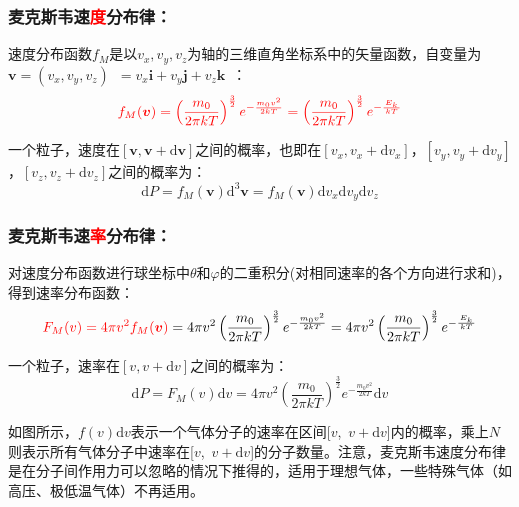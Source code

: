 \documentclass[zihao=5,UTF8]{report}
\begin{document}
\subsubsection{麦克斯韦速\textcolor{red}{度}分布律：}
速度分布函数$f_M$是以$v_x,v_y,v_z$为轴的三维直角坐标系中的矢量函数，自变量为$\boldsymbol{v} = (v_x,v_y,v_z)$\ $ = v_x\boldsymbol{i} +v_y\boldsymbol{j}+v_z\boldsymbol{k}$\ ：
\begin{equation}\textcolor{red}{f_M(\boldsymbol{v}) = \left(\frac{m_0}{2\pi kT}\right)^{\frac{3}{2}}e^{-\frac{m_0v^2}{2kT}} = \left(\frac{m_0}{2\pi kT}\right)^{\frac{3}{2}}e^{-\frac{E_k}{\,kT\,}}}
\end{equation}\par
一个粒子，速度在$[\boldsymbol{v} , \boldsymbol{v} + \mathrm{d}\boldsymbol{v}]$之间的概率，也即在$[v_x ,v_x +\mathrm{d}v_x]$，$[v_y ,v_y +\mathrm{d}v_y]$，$[v_z ,v_z +\mathrm{d}v_z]$之间的概率为：
\begin{equation}
    \mathrm{d} P =f_M(\boldsymbol{v})\mathrm{d}^3\boldsymbol{v}=f_M(\boldsymbol{v})\mathrm{d}v_x\mathrm{d}v_y\mathrm{d}v_z
\end{equation}

\subsubsection{麦克斯韦速\textcolor{red}{率}分布律：}
对速度分布函数进行球坐标中$\theta $和$\varphi$的二重积分(对相同速率的各个方向进行求和)，得到速率分布函数：
\begin{equation}\textcolor{red}{ F_M(v) = 4\pi v^2 f_M(\boldsymbol{v}) }
   = 4\pi v^2\left(\frac{m_0}{2\pi kT}\right)^{\frac{3}{2}}e^{-\frac{m_0v^2}{2kT}} = 4\pi v^2\left(\frac{m_0}{2\pi kT}\right)^{\frac{3}{2}}e^{-\frac{E_k}{\,kT\,}}
\end{equation}\par

一个粒子，速率在$[v, v+\mathrm{d}v]$之间的概率为：
\begin{equation}
    \mathrm{d} P = F_M(v)\mathrm{d}v = 4\pi v^2\left(\frac{m_0}{2\pi kT}\right)^{\frac{3}{2}}e^{-\frac{m_0v^2}{2kT}}\mathrm{d}v
\end{equation}
\par
{\color{gray}\small  如图所示，$f(v)\mathrm{d}v$表示一个气体分子的速率在区间[$v$,\ $v+\mathrm{d}v$]内的概率，乘上$N$则表示所有气体分子中速率在[$v$,\ $v+\mathrm{d}v$]的分子数量。注意，麦克斯韦速度分布律是在分子间作用力可以忽略的情况下推得的，适用于理想气体，一些特殊气体（如高压、极低温气体）不再适用。}
\end{document}
